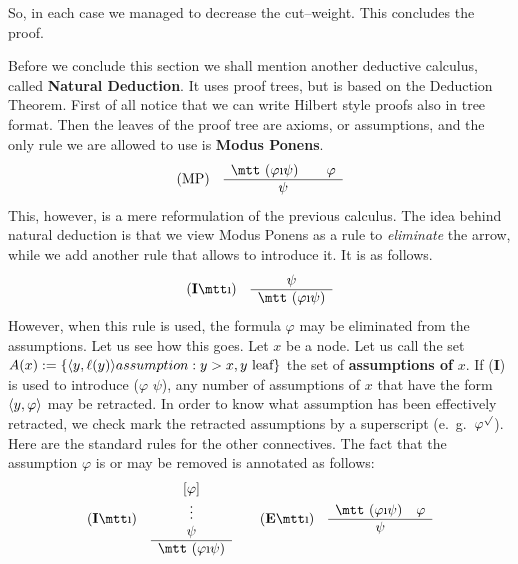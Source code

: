 So, in each case we managed to decrease the cut--weight.
This concludes the proof.
\proofend

Before we conclude this section we shall mention another deductive
calculus, called \textbf{Natural Deduction}. It uses proof trees, but
is based on the Deduction Theorem. First of all notice that we can
write Hilbert style proofs also in tree format. Then the leaves of
the proof tree are axioms, or assumptions, and the only rule we
are allowed to use is \textbf{Modus Ponens}.
\begin{equation}
\mbox{\rm (MP)}\quad\begin{array}{c}
    \mbox{\mtt ($\varphi$\symbol{25}$\psi$)}\qquad
    \varphi \\\hline
    \psi
    \end{array}
\end{equation}
This, however, is a mere reformulation of the previous calculus. The
idea behind natural deduction is that we view Modus Ponens as a rule
to {\it eliminate\/} the arrow, while we add another rule that allows
to introduce it. It is as follows.
\begin{equation}
\mbox{\rm (\textbf{I}{\mtt\symbol{25}})}\quad
    \begin{array}{c}\psi \\\hline
    \mbox{\mtt ($\varphi$\symbol{25}$\psi$)}
    \end{array}
\end{equation}
However, when this rule is used, the formula $\varphi$ may be
eliminated from the assumptions. Let us see how this goes. Let
$x$ be a node. Let us call the set $A(x) := \{\auf y, \ell(y)\zu
\index{assumption}%
: y > x, y \mbox{ leaf}\}$ the set of \textbf{assumptions of} $x$.
If (\textbf{I}{\mtt{}}) is used to introduce {\mtt ($\varphi$%
$\psi$)}, any number of assumptions of $x$ that have the 
form $\langle y, \varphi\rangle$ may be retracted. In order to know what
assumption has been effectively retracted, we check mark the
retracted assumptions by a superscript (e.~g.~$\varphi^{\surd}$).
\index{$\varphi^{\surd}$, $[\varphi]$}%
Here are the standard rules for the other connectives. The fact
that the assumption $\varphi$ is or may be removed is annotated as
follows:
\begin{equation}
\mbox{\rm (\textbf{I}{\mtt\symbol{25}})}\quad
    \begin{array}{c}[\varphi] \\
    \vdots \\
    \psi \\\hline
    \mbox{\mtt ($\varphi$\symbol{25}$\psi$)}
    \end{array}
\qquad
\mbox{\rm (\textbf{E}{\mtt\symbol{25}})}\quad
    \begin{array}{c} 
    \mbox{\mtt ($\varphi$\symbol{25}$\psi$)} \quad 
	\varphi \\\hline
	\psi 
    \end{array}
\end{equation}
